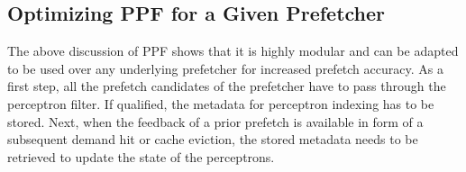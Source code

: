 \subsection{Optimizing PPF for a Given Prefetcher}
\label{Arch-Generalizing}
The above discussion of PPF shows that it is highly modular and can be
adapted to be used over any {underlying} prefetcher for increased prefetch
accuracy. As a first step, all the prefetch
candidates of the prefetcher have to pass through the perceptron filter. 
If qualified, the metadata for perceptron indexing has to be stored. 
Next, when the feedback of a prior prefetch is available in form
of a subsequent demand hit or cache eviction, the stored
metadata needs to be retrieved to update the state of the perceptrons.


